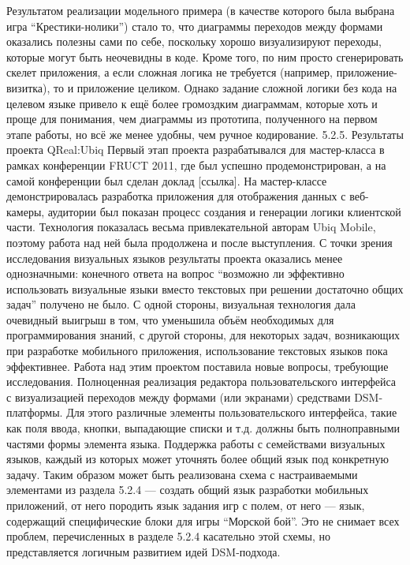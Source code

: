 	Результатом реализации модельного примера (в качестве которого была выбрана игра “Крестики-нолики”) стало то, что диаграммы переходов между формами оказались полезны сами по себе, поскольку хорошо визуализируют переходы, которые могут быть неочевидны в коде. Кроме того, по ним просто сгенерировать скелет приложения, а если сложная логика не требуется (например, приложение-визитка), то и приложение целиком. Однако задание сложной логики без кода на целевом языке привело к ещё более громоздким диаграммам, которые хоть и проще для понимания, чем диаграммы из прототипа, полученного на первом этапе работы, но всё же менее удобны, чем ручное кодирование.	
5.2.5. Результаты проекта QReal:Ubiq 
	Первый этап проекта разрабатывался для мастер-класса в рамках конференции FRUCT 2011, где был успешно продемонстрирован, а на самой конференции был сделан доклад [ссылка]. На мастер-классе демонстрировалась разработка приложения для отображения данных с веб-камеры, аудитории был показан процесс создания и генерации логики клиентской части. Технология показалась весьма привлекательной авторам Ubiq Mobile, поэтому работа над ней была продолжена и после выступления.
	С точки зрения исследования визуальных языков результаты проекта оказались менее однозначными: конечного ответа на вопрос “возможно ли эффективно использовать визуальные языки вместо текстовых при решении достаточно общих задач” получено не было. С одной стороны, визуальная технология дала очевидный выигрыш в том, что уменьшила объём необходимых для программирования знаний, с другой стороны, для некоторых задач, возникающих при разработке мобильного приложения, использование текстовых языков пока эффективнее. 
Работа над этим проектом поставила новые вопросы, требующие исследования. 
Полноценная реализация редактора пользовательского интерфейса с визуализацией переходов между формами (или экранами) средствами DSM-платформы. Для этого различные элементы пользовательского интерфейса, такие как поля ввода, кнопки, выпадающие списки и т.д. должны быть полноправными частями формы элемента языка.
Поддержка работы с семействами визуальных языков, каждый из которых может уточнять более общий язык под конкретную задачу. Таким образом может быть реализована схема с настраиваемыми элементами из раздела 5.2.4 --- создать общий язык разработки мобильных приложений, от него породить язык задания игр с полем, от него --- язык, содержащий специфические блоки для игры “Морской бой”. Это не снимает всех проблем, перечисленных в разделе 5.2.4 касательно этой схемы, но представляется логичным развитием идей DSM-подхода.
